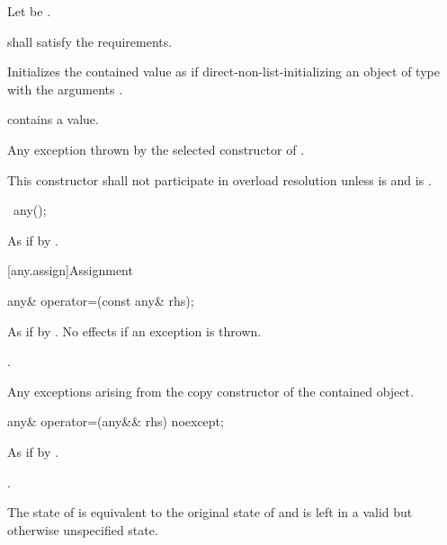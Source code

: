 \begin{itemdescr}
\pnum
Let  be .

\pnum
\requires {} shall satisfy the  requirements.

\pnum
\effects Initializes the contained value as if direct-non-list-initializing an object of
type  with the arguments .

\pnum
\postconditions {} contains a value.

\pnum
\throws Any exception thrown by the selected constructor of .

\pnum
\remarks
This constructor shall not participate in overload resolution unless
 is  and
 is .
\end{itemdescr}

\begin{itemdecl}
~any();
\end{itemdecl}

\begin{itemdescr}
\pnum
\effects
As if by .
\end{itemdescr}

[any.assign]{Assignment}

%
\begin{itemdecl}
any& operator=(const any& rhs);
\end{itemdecl}

\begin{itemdescr}
\pnum
\effects
As if by .
No effects if an exception is thrown.

\pnum
\returns
{}.

\pnum
\throws
Any exceptions arising from the copy constructor of the contained object.
\end{itemdescr}

%
\begin{itemdecl}
any& operator=(any&& rhs) noexcept;
\end{itemdecl}

\begin{itemdescr}
\pnum
\effects
As if by .

\pnum
\returns
{}.

\pnum
\postconditions
The state of  is equivalent to the original state of 
and  is left in a valid but otherwise unspecified state.
\end{itemdescr}

